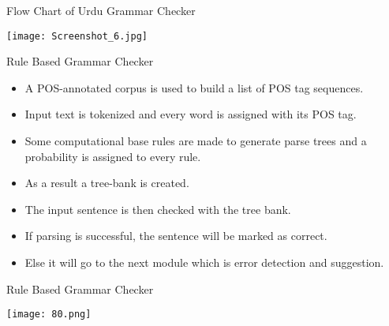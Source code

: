 \documentclass{beamer}
\begin{document}
\begin{frame}{Flow Chart of Urdu Grammar Checker}
\begin{center}
	\texttt{[image: Screenshot\_6.jpg]}	
\end{center}
\end{frame}


\begin{frame}{Rule Based Grammar Checker}
	\begin{itemize}
	\item  A POS-annotated corpus is used to build a list of POS tag sequences. \\
	\vspace{0.5em}
	\item  Input text is tokenized and every word is assigned with its POS tag. \\
	\vspace{0.5em}
	\item  Some computational base rules are made to generate parse trees and a probability is assigned to every rule.
	\vspace{0.5em}
	\item  As a result a tree-bank is created. \\
	\vspace{0.5em} 
	\item  The input sentence is then checked with the tree bank. \\
	\vspace{0.5em}
	\item  If parsing is successful, the sentence will be marked as correct. \\
	\vspace{0.5em}
	\item  Else it will go to the next module which is error detection and suggestion.
	\end{itemize}
\end{frame}


\begin{frame}{Rule Based Grammar Checker}
\begin{center}
	\texttt{[image: 80.png]}	
\end{center}
\end{frame}
\end{document}

